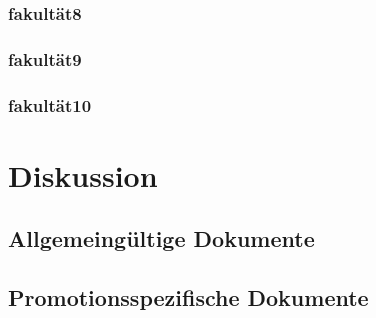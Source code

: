 \subsubsection{\gls{fakultät8}}
\subsubsection{\gls{fakultät9}}
\subsubsection{\gls{fakultät10}}

\section{Diskussion}\label{sec:luh-repo-discussion}
\subsection{Allgemeingültige Dokumente}\label{sec:luh-repo-discussion-general}
\subsection{Promotionsspezifische Dokumente}\label{sec:luh-repo-discussion-specific}

